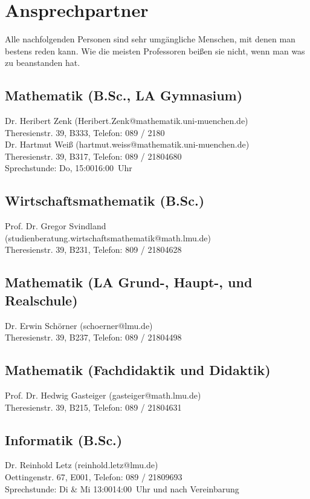 \section{Ansprechpartner}

Alle nachfolgenden Personen sind sehr umgängliche Menschen, mit denen
man bestens reden kann. Wie die meisten Professoren beißen sie nicht,
wenn man was zu beanstanden hat.

\subsection*{Mathematik (B.Sc., LA Gymnasium)}
Dr. Heribert Zenk (Heribert.Zenk@mathematik.uni-muenchen.de)\\
Theresienstr. 39, B333, Telefon: 089 / 2180\\

Dr. Hartmut Weiß (hartmut.weiss@mathematik.uni-muenchen.de)\\
Theresienstr. 39, B317, Telefon: 089 / 2180\emd{}4680\\
Sprechstunde: Do, 15:00\emd{}16:00~Uhr

\subsection*{Wirtschaftsmathematik (B.Sc.)}
Prof. Dr. Gregor Svindland (studienberatung.wirtschaftsmathematik@math.lmu.de)\\
Theresienstr. 39, B231, Telefon: 809 / 2180\emd{}4628\\

\subsection*{Mathematik (LA Grund-, Haupt-, und Realschule)}
Dr. Erwin Schörner (schoerner@lmu.de)\\
Theresienstr. 39, B237, Telefon: 089 / 2180\emd{}4498\\

\subsection*{Mathematik (Fachdidaktik und Didaktik)}
Prof. Dr. Hedwig Gasteiger (gasteiger@math.lmu.de)\\
Theresienstr. 39, B215, Telefon: 089 / 2180\emd{}4631\\

\subsection*{Informatik (B.Sc.)}
Dr. Reinhold Letz (reinhold.letz@lmu.de)\\
Oettingenstr. 67, E001, Telefon: 089 / 2180\emd{}9693\\
Sprechstunde: Di \& Mi 13:00\emd{}14:00~Uhr und nach Vereinbarung

